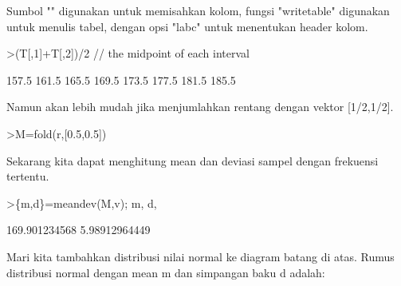 \documentclass[a4paper,10pt]{article}
\begin{document}
\begin{eulernotebook}
\begin{eulercomment}
\begin{eulercomment}
\begin{eulercomment}
Sumbol "\textbar{}" digunakan untuk memisahkan kolom, fungsi "writetable"
digunakan untuk menulis tabel, dengan opsi "labc" untuk menentukan
header kolom.
\end{eulercomment}
\begin{eulerprompt}
>(T[,1]+T[,2])/2 // the midpoint of each interval
\end{eulerprompt}
\begin{euleroutput}
          157.5 
          161.5 
          165.5 
          169.5 
          173.5 
          177.5 
          181.5 
          185.5 
\end{euleroutput}
\begin{eulercomment}
Namun akan lebih mudah jika menjumlahkan rentang dengan vektor
[1/2,1/2].
\end{eulercomment}
\begin{eulerprompt}
>M=fold(r,[0.5,0.5])
\end{eulerprompt}
\begin{euleroutput}
  [157.5,  161.5,  165.5,  169.5,  173.5,  177.5,  181.5,  185.5]
\end{euleroutput}
\begin{eulercomment}
Sekarang kita dapat menghitung mean dan deviasi sampel dengan
frekuensi tertentu.
\end{eulercomment}
\begin{eulerprompt}
>\{m,d\}=meandev(M,v); m, d,
\end{eulerprompt}
\begin{euleroutput}
  169.901234568
  5.98912964449
\end{euleroutput}
\begin{eulercomment}
Mari kita tambahkan distribusi nilai normal ke diagram batang di atas.
Rumus distribusi normal dengan mean m dan simpangan baku d adalah:


\end{eulercomment}
\end{eulercomment}
\end{eulercomment}
\end{eulernotebook}
\end{document}
